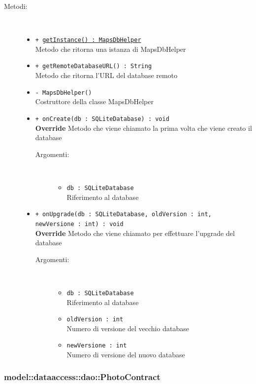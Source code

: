 \documentclass[../DefinizioneDiProdotto.tex]{subfiles}
\begin{document}
\begin{description}
\begin{itemize}
\end{itemize}
\item[Metodi:] \
\begin{itemize}
\item \texttt{+ \underline{getInstance() : MapsDbHelper}}\\
Metodo che ritorna una istanza di MapsDbHelper
 \item \texttt{+ getRemoteDatabaseURL() : String}\\
Metodo che ritorna l'URL del database remoto
 \item \texttt{- MapsDbHelper()}\\
Costruttore della classe MapsDbHelper
 \item \texttt{+ onCreate(db : SQLiteDatabase) : void}\\
\textbf{Override} Metodo che viene chiamato la prima volta che viene creato il database
 \begin{description}
\item[Argomenti:] \
\begin{itemize}
\item \texttt{db : SQLiteDatabase}\\
Riferimento al database\end{itemize}
\end{description}
\item \texttt{+ onUpgrade(db : SQLiteDatabase, oldVersion : int, newVersione : int) : void}\\
\textbf{Override} Metodo che viene chiamato per effettuare l'upgrade del database
 \begin{description}
\item[Argomenti:] \
\begin{itemize}
\item \texttt{db : SQLiteDatabase}\\
Riferimento al database\item \texttt{oldVersion : int}\\
Numero di versione del vecchio database\item \texttt{newVersione : int}\\
Numero di versione del nuovo database\end{itemize}
\end{description}
\end{itemize}
\end{description}

\subsubsection{model::dataaccess::dao::PhotoContract}
\end{document}

